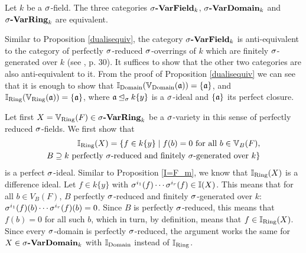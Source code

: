 \begin{prop}
Let $k$ be a $\sigma$-field. The three categories $\sigma\text{{\normalfont\textbf{-VarField}}}_k$, $\sigma\text{{\normalfont\textbf{-VarDomain}}}_k$ and $\sigma\text{{\normalfont\textbf{-VarRing}}}_k$ are equivalent.

\begin{bew}
Similar to Proposition \ref{dualisequiv}, the category $\sigma\text{{\normalfont\textbf{-VarField}}}_k$ is anti-equivalent to the category of perfectly $\sigma$-reduced $\sigma$-overrings of $k$ which are finitely $\sigma$-generated over $k$ (see \cite{wibmer}, p. 30).
It suffices to show that the other two categories are also anti-equivalent to it. From the proof of Proposition \ref{dualisequiv} we can see that it is enough to show that $\mathbb{I}_{\operatorname{Domain}}(\mathbb{V}_{\operatorname{Domain}}(\mathfrak{a})) = \{\mathfrak{a}\}$, and $\mathbb{I}_{\operatorname{Ring}}(\mathbb{V}_{\operatorname{Ring}}(\mathfrak{a})) = \{\mathfrak{a}\}$,
 where $\mathfrak{a} \unlhd_{\sigma} k\{y\}$ is a $\sigma$-ideal and $\{ \mathfrak{a} \}$ its perfect closure. 

Let first $X  = \mathbb{V}_{\operatorname{Ring}}(F) \in \sigma\text{{\normalfont\textbf{-VarRing}}}_k$ be a $\sigma$-variety in this sense of perfectly reduced $\sigma$-fields. 
We first show that \begin{align*} \mathbb{I}_{\operatorname{Ring}}(X) =  \{ f \in k\{y\} \mid f(b) = 0 \text{ for all } b \in \mathbb{V}_B(F), \\ B \supseteq k\text{ perfectly }\sigma\text{-reduced and finitely }\sigma\text{-generated over }k \} \end{align*}
 is a perfect $\sigma$-ideal. Similar to Proposition \ref{I=F_m}, we know that $\mathbb{I}_{\operatorname{Ring}}(X)$ is a difference ideal. Let $f \in k\{y\}$ with $\sigma^{i_1}(f) \cdots \sigma^{i_r}(f) \in \mathbb{I}(X)$. This means that for all $b \in V_B(F)$,
 $B$ perfectly $\sigma$-reduced and finitely $\sigma$-generated over $k$: $\sigma^{i_1}(f)(b) \cdots \sigma^{i_r}(f)(b) = 0$. Since $B$ is perfectly $\sigma$-reduced, this means that $f(b) = 0$ for all such $b$,
 which in turn, by definition, means that $f \in \mathbb{I}_{\operatorname{Ring}}(X)$. Since every $\sigma$-domain is perfectly $\sigma$-reduced, the argument works the same for $X \in \sigma\text{{\normalfont\textbf{-VarDomain}}}_k$ with $\mathbb{I}_{\operatorname{Domain}}$ instead of $\mathbb{I}_{\operatorname{Ring}}$.


\end{bew}
\end{prop}

